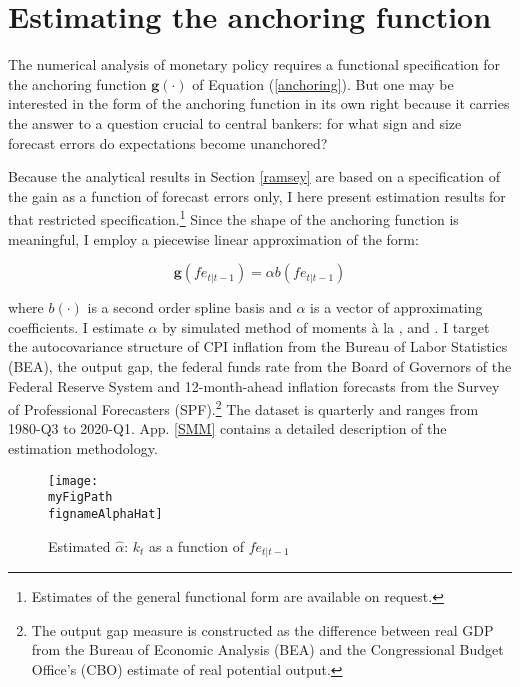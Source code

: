 \documentclass[11pt]{article}
\def \myFigPath {../../figures/}
\renewcommand{\[}{\begin{equation}}
\renewcommand{\]}{\end{equation}}
\def\mySmallFigScale{0.22}
\def\fignameAlphaHat{alph_opt_constant_only_pi_only_N_100_nfe_5_loss_0_gridspacing_uniform_Wdiffs2_100000_Wmid_0_Nestimations_command_GMM_LOMgain_univariate_23_Jul_2020}
\begin{document}
\section{Estimating the anchoring function}\label{estimation}
The numerical analysis of monetary policy requires a functional specification for the anchoring function $\mathbf{g}(\cdot)$ of Equation (\ref{anchoring}). But one may be interested in the form of the anchoring function in its own right because it carries the answer to a question crucial to central bankers: for what sign and size forecast errors do expectations become unanchored?

Because the analytical results in Section \ref{ramsey} are based on a specification of the gain as a function of forecast errors only, I here present estimation results for that restricted specification.\footnote{Estimates of the general functional form are available on request.} Since the shape of the anchoring function is meaningful, I employ a piecewise linear approximation of the form:

\begin{equation}
\mathbf{g}(fe_{t|t-1}) = \alpha b(fe_{t|t-1})\label{gain}
\end{equation}

where $b(\cdot)$ is a second order spline basis and $\alpha$ is a vector of approximating coefficients. I estimate $\alpha$ by simulated method of moments \`a la \cite{lee1991simulation}, \cite{duffie1990simulated} and \cite{smith1993SMM}. I target the autocovariance structure of CPI inflation from the Bureau of Labor Statistics (BEA), the output gap, the federal funds rate from the Board of Governors of the Federal Reserve System and 12-month-ahead inflation forecasts from the Survey of Professional Forecasters (SPF).\footnote{The output gap measure is constructed as the difference between real GDP from the Bureau of Economic Analysis (BEA) and the Congressional Budget Office's (CBO) estimate of real potential output.} The dataset is quarterly and ranges from 1980-Q3 to 2020-Q1. App. \ref{SMM} contains a detailed description of the estimation methodology.

\begin{figure}[h!]
\texttt{[image: \\myFigPath \\fignameAlphaHat]}
\caption{Estimated $\hat{\alpha}$: $k_t$ as a function of $fe_{t|t-1}$}
\label{alpha_hat}
\end{figure}
\end{document}
